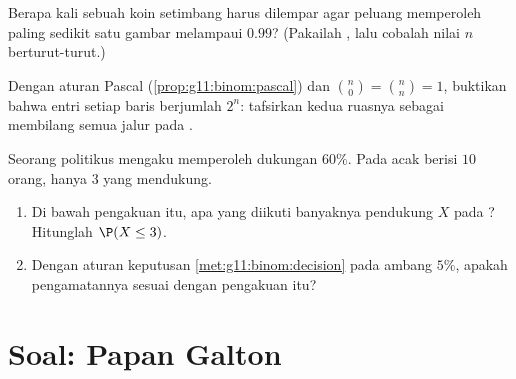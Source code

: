 \begin{exercise}[$\star\star$]\label{exo:g11:binom:9}
Berapa kali sebuah koin setimbang harus dilempar agar peluang memperoleh
paling sedikit satu gambar melampaui $0.99$? (Pakailah , lalu
cobalah nilai $n$ berturut-turut.)
\end{exercise}

\begin{exercise}[$\star\star$]\label{exo:g11:binom:10}
Dengan aturan Pascal (\cref{prop:g11:binom:pascal}) dan
$\binom n0 = \binom nn = 1$, buktikan bahwa entri setiap baris
 berjumlah $2^n$: tafsirkan kedua ruasnya sebagai membilang
semua jalur pada .
\end{exercise}

\begin{exercise}[$\star\star\star$]\label{exo:g11:binom:11}
Seorang politikus mengaku memperoleh dukungan $60\%$. Pada  acak berisi
$10$ orang, hanya $3$ yang mendukung.
\begin{enumerate}
  \item Di bawah pengakuan itu,  apa yang diikuti banyaknya
        pendukung $X$ pada ? Hitunglah $\P(X \leq 3)$.
  \item Dengan aturan keputusan \cref{met:g11:binom:decision} pada ambang
        $5\%$, apakah pengamatannya sesuai dengan pengakuan itu?
\end{enumerate}
\end{exercise}

\section{Soal: Papan Galton}

